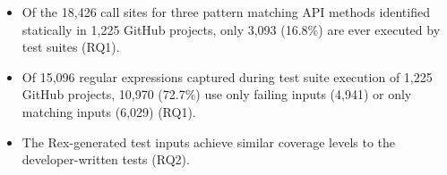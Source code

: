 \begin{itemize}
\item Of the 18,426 call sites for three pattern matching API methods identified statically in 1,225 GitHub projects, only 3,093 (16.8\%) are ever executed by test suites (RQ1).
\item Of 15,096 regular expressions captured during test suite execution of 1,225 GitHub projects, 10,970 (72.7\%) use only failing inputs (4,941) or only matching inputs (6,029) (RQ1). 
\item The Rex-generated test inputs achieve similar coverage levels to the developer-written tests (RQ2). 
\end{itemize}

